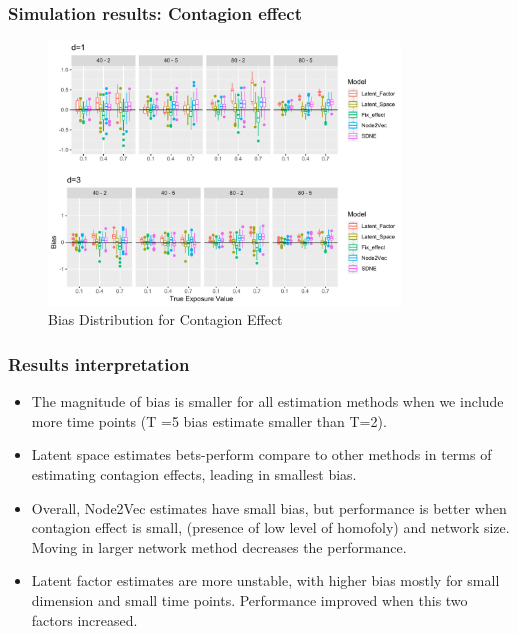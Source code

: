 \documentclass{beamer}
\begin{document}
\begin{frame}
\frametitle{Simulation results: Contagion effect }
\begin{figure}[H]
  \centering
  \includegraphics[width=10 cm, height=7cm ]{Rplot03after_expo.pdf}
  \caption{ Bias Distribution for Contagion Effect}
  \label{Fig:fig1}
\end{figure}

\end{frame}
\begin{frame}
\frametitle{ Results interpretation}
\begin{itemize}
\item  The magnitude of bias is smaller for
all estimation methods when we include more time points (T =5 bias estimate smaller than T=2).
\vspace{10pt}
\item Latent space estimates bets-perform compare to other methods in terms of estimating contagion effects, leading in smallest bias.
\vspace{10pt}
\item Overall,  Node2Vec estimates have small
bias, but performance is  better when contagion effect is small, (presence of low level of homofoly) and network size. Moving in larger network method decreases the performance. 
\vspace{10pt}
\item Latent factor estimates are more unstable,
with higher bias mostly for small dimension and small time points. Performance improved when this two factors increased.
\end{itemize}
\end{frame}
\end{document}
